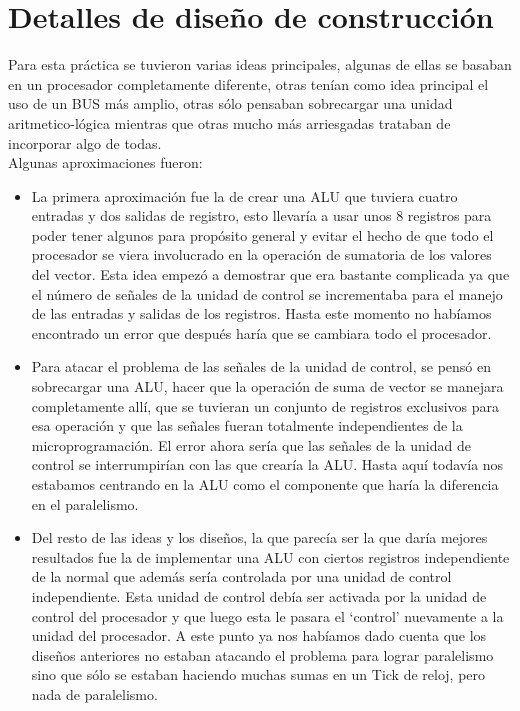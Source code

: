 \section{Detalles de diseño de construcción}

Para esta práctica se tuvieron varias ideas principales, algunas de ellas se basaban en un procesador completamente
diferente, otras tenían como idea principal el uso de un BUS más amplio, otras sólo pensaban sobrecargar una unidad
aritmetico-lógica mientras que otras mucho más arriesgadas trataban de incorporar algo de todas.\\
Algunas aproximaciones fueron:
\begin{itemize}

\item La primera aproximación fue la de crear una ALU que tuviera cuatro entradas y dos salidas de registro, esto llevaría
a usar unos 8 registros para poder tener algunos para propósito general y evitar el hecho de que todo el procesador se
viera involucrado en la operación de sumatoria de los valores del vector. Esta idea empezó a demostrar que era bastante
complicada ya que el número de señales de la unidad de control se incrementaba para el manejo de las entradas y salidas
de los registros. Hasta este momento no habíamos encontrado un error que después haría que se cambiara todo el
procesador.

\item Para atacar el problema de las señales de la unidad de control, se pensó en sobrecargar una ALU, hacer que la operación
de suma de vector se manejara completamente allí, que se tuvieran un conjunto de registros exclusivos para esa operación y que
las señales fueran totalmente independientes de la microprogramación. El error ahora sería que las señales de la unidad de control
se interrumpirían con las que crearía la ALU. Hasta aquí todavía nos estabamos centrando en la ALU como el componente que
haría la diferencia en el paralelismo.

\item Del resto de las ideas y los diseños, la que parecía ser la que daría mejores resultados fue la de implementar una
ALU con ciertos registros independiente de la normal que además sería controlada por una unidad de control independiente.
Esta unidad de control debía ser activada por la unidad de control del procesador  y que luego esta le pasara el `control'
nuevamente a la unidad del procesador.
A este punto ya nos habíamos dado cuenta que los diseños anteriores no estaban atacando el problema para lograr
paralelismo sino que sólo se estaban haciendo muchas sumas en un Tick de reloj, pero nada de paralelismo.

\end{itemize}